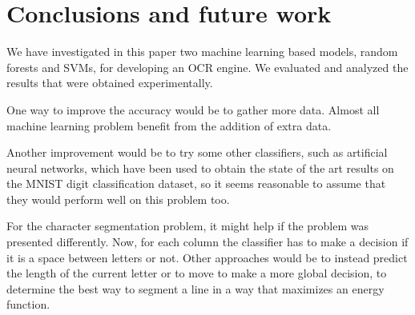 \section{Conclusions and future work}
\label{ref:concl}
We have investigated in this paper two machine learning based models, random forests and SVMs, for developing an OCR engine. We evaluated and analyzed the results that were obtained experimentally. 

One way to improve the accuracy would be to gather more data. Almost all machine learning problem benefit from the addition of extra data\cite{halevy2009unreasonable}.

Another improvement would be to try some other classifiers, such as artificial neural networks, which have been used to obtain the state of the art results on the MNIST digit classification dataset, so it seems reasonable to assume that they would perform well on this problem too. 

For the character segmentation problem, it might help if the problem was presented differently. Now, for each column the classifier has to make a decision if it is a space between letters or not. Other approaches would be to instead predict the length of the current letter or to move to make a more global decision, to determine the best way to segment a line in a way that maximizes an energy function.